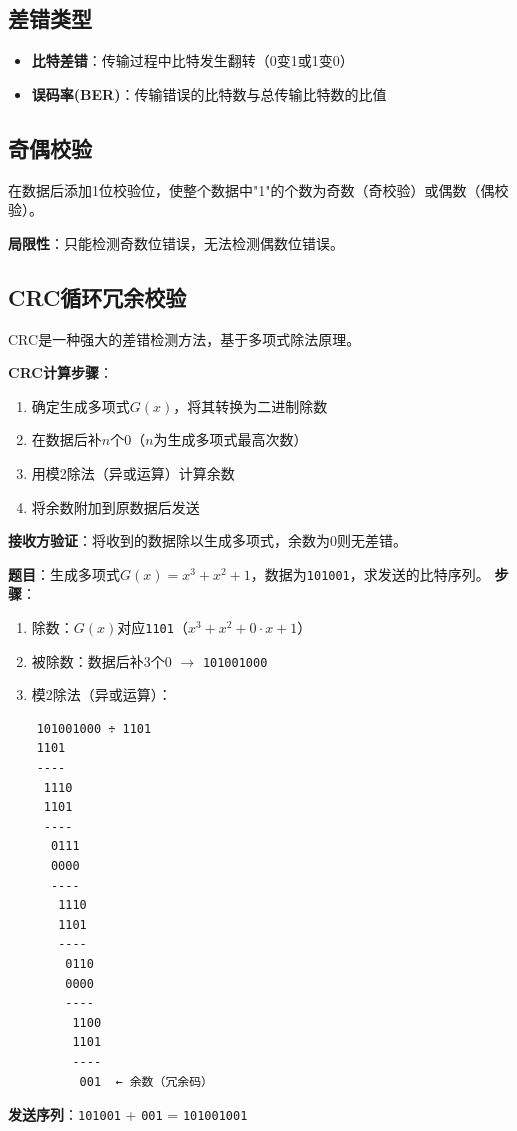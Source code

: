 \documentclass[12pt,a4paper,openany]{ctexbook}
\begin{document}
\subsection{差错类型}
\begin{itemize}[leftmargin=2em,itemsep=0pt]
    \item \textbf{比特差错}：传输过程中比特发生翻转（0变1或1变0）
    \item \textbf{误码率(BER)}：传输错误的比特数与总传输比特数的比值
\end{itemize}

\subsection{奇偶校验}
在数据后添加1位校验位，使整个数据中"1"的个数为奇数（奇校验）或偶数（偶校验）。

\textbf{局限性}：只能检测奇数位错误，无法检测偶数位错误。

\subsection{CRC循环冗余校验}
CRC是一种强大的差错检测方法，基于多项式除法原理。

\textbf{CRC计算步骤}：
\begin{enumerate}[leftmargin=2em,itemsep=0pt]
    \item 确定生成多项式$G(x)$，将其转换为二进制除数
    \item 在数据后补$n$个0（$n$为生成多项式最高次数）
    \item 用模2除法（异或运算）计算余数
    \item 将余数附加到原数据后发送
\end{enumerate}

\textbf{接收方验证}：将收到的数据除以生成多项式，余数为0则无差错。

\begin{examplebox}[例题3.1 CRC计算]
\textbf{题目}：生成多项式$G(x)=x^3+x^2+1$，数据为\texttt{101001}，求发送的比特序列。
\tcblower
\textbf{步骤}：
\begin{enumerate}[itemsep=0pt]
    \item 除数：$G(x)$对应\texttt{1101}（$x^3+x^2+0\cdot x+1$）
    \item 被除数：数据后补3个0 $\rightarrow$ \texttt{101001000}
    \item 模2除法（异或运算）：
\end{enumerate}
\begin{verbatim}
    101001000 ÷ 1101
    1101
    ----
     1110
     1101
     ----
      0111
      0000
      ----
       1110
       1101
       ----
        0110
        0000
        ----
         1100
         1101
         ----
          001  ← 余数（冗余码）
\end{verbatim}
\textbf{发送序列}：\texttt{101001} + \texttt{001} = \texttt{101001001}
\end{examplebox}
\end{document}
